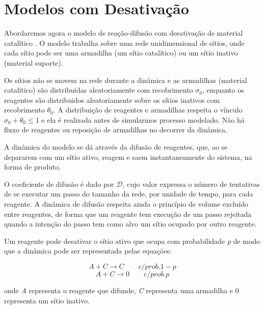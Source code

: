 
\section{Modelos com Desativação}

Abordaremos agora o modelo de reação-difusão com desativação de material
catalítico \cite{7}. O modelo trabalha sobre uma rede unidimensional de
sítios, onde cada sítio pode ser uma armadilha (um sítio catalítico) ou um sítio
inativo (material suporte).

Os sítios não se movem na rede durante a dinâmica e
as armadilhas (material catalítico) são distribuídas aleatoriamente com
recobrimento $\sigma_0$, enquanto os reagentes são distribuidos aleatoriamente
sobre os sítios inativos com recobrimento $\theta_0$. A distribuição de
reagentes e armadilhas respeita o vínculo $\sigma_0 + \theta_0 \leq 1$ e ela é
realizada antes de simularmos processo modelado. Não há fluxo de reagentes ou
reposição de armadilhas no decorrer da dinâmica.

A dinâmica do modelo se dá através da difusão de reagentes, que, ao se depararem
com um sítio ativo, reagem e saem instantaneamente do sistema, na forma de
produto.

O coeficiente de difusão é dado por $\mathcal{D}$, cujo valor expressa
o número de tentativas de se executar um passo do tamanho da rede, por unidade
de tempo, para cada reagente. A dinâmica de difusão respeita ainda o princípio
de volume excluído entre reagentes, de forma que um reagente tem execução de um
passo rejeitada quando a intenção do passo tem como alvo um sítio ocupado por
outro reagente.

Um reagente pode desativar o sítio ativo que ocupa com probabilidade \textit{p}
de modo que a dinâmica pode ser representada pelas equações:

{
\setlength{\belowdisplayskip}{0pt} \setlength{\belowdisplayshortskip}{0pt}
\setlength{\abovedisplayskip}{0pt} \setlength{\abovedisplayshortskip}{0pt}

\begin{equation}
  A + C \longrightarrow C \qquad c/ prob. 1 - p
  \label{Equation-031-ModeloTradicional}
\end{equation}
\begin{equation}
  A + C \longrightarrow 0 \qquad c/ prob. p
  \label{Equation-032-ModeloEnvenenamento}
\end{equation}
}

\noindent onde \textit{A} representa o reagente que difunde, \textit{C}
representa uma armadilha e 0 representa um sítio inativo.

